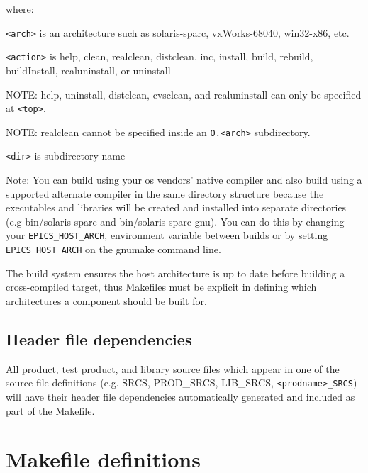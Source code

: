 where: 

\begin{description}
\item \verb|<arch>| is an architecture such as solaris-sparc, vxWorks-68040, win32-x86, etc.

\item \verb|<action>| is help, clean, realclean, distclean, inc, install, build, rebuild, buildInstall, realuninstall, or uninstall

\item NOTE: help, uninstall, distclean, cvsclean, and realuninstall can only be specified at \verb|<top>|.

\item NOTE: realclean cannot be specified inside an \verb|O.<arch>| subdirectory.

\item \verb|<dir>| is subdirectory name

\end{description}

Note: You can build using your os vendors' native compiler and also build using a supported alternate compiler in the same directory structure because the executables and libraries will be created and installed into separate directories (e.g bin/solaris-sparc and bin/solaris-sparc-gnu).
You can do this by changing your \verb|EPICS_HOST_ARCH|, environment variable between builds or by setting \verb|EPICS_HOST_ARCH| on the gnumake command line.

The build system ensures the host architecture is up to date before building a cross-compiled target, thus Makefiles must be explicit in defining which architectures a component should be built for.

\subsection{Header file dependencies}

All product, test product, and library source files which appear in one of the source file definitions (e.g. SRCS, PROD\_SRCS, LIB\_SRCS, \verb|<prodname>_SRCS|) will have their header file dependencies automatically generated and included as part of the Makefile.

\section{Makefile definitions}

